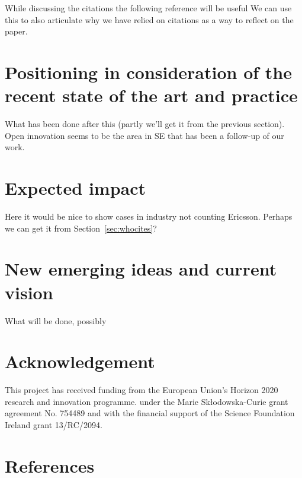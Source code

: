 \documentclass[sigplan]{acmart}
\begin{document}
While discussing the citations the following reference will be useful \cite{penders2018ten} We can use this to also articulate why we have relied on citations as a way to reflect on the paper.


\section{Positioning in consideration of the recent state of the art and practice}\label{sec:soa} 
What has been done after this (partly we'll get it from the previous section).
Open innovation seems to be the area in SE that has been a follow-up of our work.

\section{Expected impact}\label{sec:impact}
Here it would be nice to show cases in industry not counting Ericsson. Perhaps we can get it from Section~\ref{sec:whocites}?



\section{New emerging ideas and current vision}\label{sec:fw} 
What will be done, possibly

\section*{Acknowledgement}
This project has received funding from the European Union's Horizon 2020 research and innovation programme. under the Marie Skłodowska-Curie grant agreement No. 754489 and with the financial support of the Science Foundation Ireland grant 13/RC/2094.

\section*{References}








\end{document}
